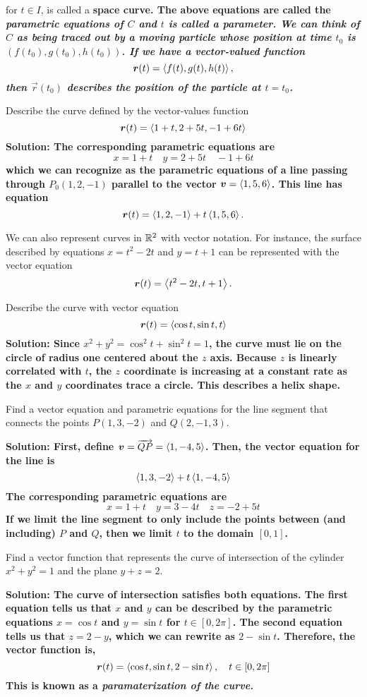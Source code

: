 for \(t\in I\), is called a \bf{space curve}. The above equations are called the \it{parametric equations} of \(C\) and \(t\) is called a \it{parameter}. We can think of \(C\) as being traced out by a moving particle whose position at time \(t_0\) is \((f(t_0), g(t_0), h(t_0))\). If we have a vector-valued function \[ \boldsymbol{r}(t) = \left\langle f(t), g(t), h(t)\right\rangle, \] then \( \vec r(t_0) \) describes the position of the particle at \(t=t_0\). 
\begin{example}
    Describe the curve defined by the vector-values function \[ \boldsymbol{r}(t) = \left\langle1+t, 2+5t, -1+6t\right\rangle \]\bf{Solution: }The corresponding parametric equations are \[x = 1+t\quad y=2+5t\quad -1+6t \] which we can recognize as the parametric equations of a line passing through \(P_0(1, 2, -1)\) parallel to the vector \(\boldsymbol{v} = \left\langle1, 5, 6\right\rangle\). This line has equation
    \[\boldsymbol{r}(t)= \left\langle1, 2, -1\right\rangle + t\left\langle1, 5, 6\right\rangle.\]
\end{example}
We can also represent curves in \(\mathbb{R}^2\) with vector notation. For instance, the surface described by equations \(x=t^2-2t\) and \(y=t+1\) can be represented with the vector equation 
\[ \boldsymbol{r}(t) = \left\langle t^2-2t, t+1\right\rangle. \]
\begin{example}
    Describe the curve with vector equation 
    \[ \boldsymbol{r}(t) = \left\langle\cos t, \sin t, t\right\rangle \]
    \bf{Solution: }Since \(x^2+y^2 = \cos^2t+\sin^2t=1\), the curve must lie on the circle of radius one centered about the \(z\) axis. Because \(z\) is linearly correlated with \(t\), the \(z\) coordinate is increasing at a constant rate as the \(x\) and \(y\) coordinates trace a circle. This describes a helix shape.
\end{example}
\begin{example}
    Find a vector equation and parametric equations for the line segment that connects the points \(P(1, 3, -2)\) and \(Q(2, -1, 3)\).\par\bf{Solution: }First, define \(\boldsymbol{v} = \overrightarrow{QP} = \left\langle1, -4, 5\right\rangle\). Then, the vector equation for the line is
    \[ \left\langle1, 3, -2\right\rangle + t\left\langle1, -4, 5\right\rangle \] 
    The corresponding parametric equations are 
    \[ x=1+t\quad y=3-4t\quad z=-2+5t \]
    If we limit the line segment to only include the points between (and including) \(P\) and \(Q\), then we limit \(t\) to the domain \([0, 1]\).
\end{example}
\begin{example}
    Find a vector function that represents the curve of intersection of the cylinder \(x^2+y^2=1\) and the plane \(y+z=2\).\par\bf{Solution: }The curve of intersection satisfies both equations. The first equation tells us that \(x\) and \(y\) can be described by the parametric equations \(x=\cos t\) and \(y=\sin t\) for \(t\in[0, 2\pi]\). The second equation tells us that \(z=2-y\), which we can rewrite as \(2-\sin t\). Therefore, the vector function is,
    \[ \boldsymbol{r}(t) = \left\langle\cos t, \sin t, 2-\sin t\right\rangle, \quad t\in [0, 2\pi] \]
    This is known as a \it{paramaterization} of the curve.
\end{example}
